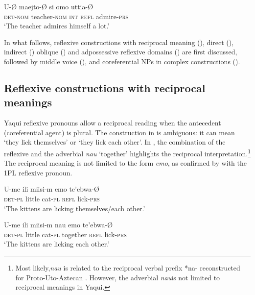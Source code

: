 \documentclass[output=paper]{langscibook}
\begin{document}
\ex
\label{ex:guerrero:14b}
\gll U-Ø maejto-Ø si omo uttia-Ø\\
  \textsc{det-nom}  teacher-\textsc{nom}  \textsc{int}  \textsc{refl}   admire-\textsc{prs}\\
\glt ‘The teacher admires himself a lot.’
\z
\z

In what follows, reflexive constructions with reciprocal meaning (), direct (), indirect () oblique () and adpossessive reflexive domains () are first discussed, followed by middle voice (), and coreferential NPs in complex constructions ().

\subsection{Reflexive constructions with reciprocal meanings}\label{sec:guerrero:3.1}

Yaqui reflexive pronouns allow a reciprocal reading when the antecedent (coreferential agent) is plural. The construction in  is ambiguous: it can mean ‘they lick themselves’ or ‘they lick each other’. In , the combination of the reflexive and the adverbial \textit{nau} ‘together’ highlights the reciprocal interpretation.\footnote{Most likely,\textit{nau} is related to the reciprocal verbal prefix *na- reconstructed for Proto-Uto-Aztecan \citep{Langacker1977}. However, the adverbial \textit{nau}is not limited to reciprocal meanings in Yaqui.} The reciprocal meaning is not limited to the form \textit{emo}, as confirmed by  with the 1PL reflexive pronoun.




\ea%
\label{ex:guerrero:15}

\ea
\label{ex:guerrero:15a}
\gll U-me  ili  miisi-m   emo  te’ebwa-Ø\\
    \textsc{det-pl}  little  cat-\textsc{pl}    \textsc{refl}    lick-\textsc{prs}\\
\glt ‘The kittens are licking themselves/each other.’

\ex
\label{ex:guerrero:15b}
\gll U-me    ili   miisi-m   nau  emo  te’ebwa-Ø\\
    \textsc{det-pl}   little  cat-\textsc{pl}      together  \textsc{refl}  lick-\textsc{prs}\\
\glt ‘The kittens are licking each other.’
\end{document}
